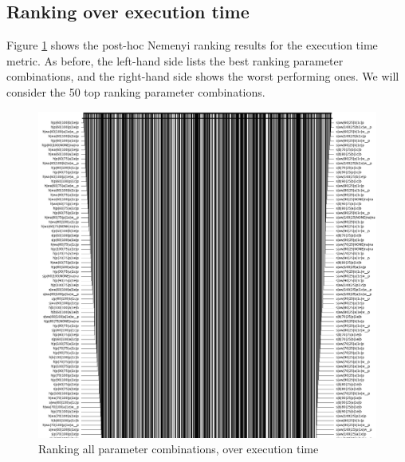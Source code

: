 \subsection{Ranking over execution time}
Figure \ref{fig:rank_seconds} shows the post-hoc Nemenyi ranking results for the execution time metric. As before, the left-hand side lists the best ranking parameter combinations, and the right-hand side shows the worst performing ones. 
We will consider the 50 top ranking parameter combinations.

\begin{figure}
  \includegraphics[width=\linewidth]{./images/chapter5/rank_seconds_cropped}
\caption{\label{fig:rank_seconds}Ranking all parameter combinations, over execution time}
\end{figure}
